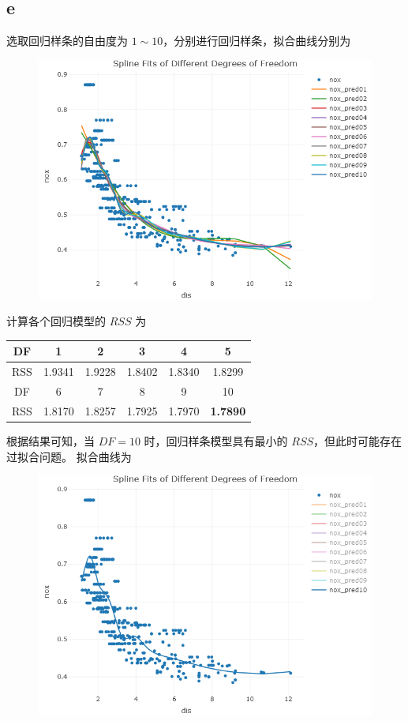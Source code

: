 \documentclass[12pt,a4paper]{article}
\begin{document}
    \subsection*{e}
    选取回归样条的自由度为 $1\sim 10$，分别进行回归样条，拟合曲线分别为
    \begin{figure}[H]
        \centering
        \includegraphics[scale=0.6]{RegSplineDF.png}
    \end{figure}
    计算各个回归模型的 $RSS$ 为
    \begin{longtable}{c|c|c|c|c|c}
        \hline
        DF & 1 & 2 & 3 & 4 & 5\\
        \hline
        RSS & 1.9341 & 1.9228 & 1.8402 & 1.8340 & 1.8299\\
        \hline
        \hline
        DF & 6 & 7 & 8 & 9 & 10\\
        \hline
        RSS & 1.8170 & 1.8257 & 1.7925 & 1.7970 & \textbf{1.7890}\\
        \hline
    \end{longtable}
    根据结果可知，当 $DF=10$ 时，回归样条模型具有最小的 $RSS$，但此时可能存在过拟合问题。
    拟合曲线为
    \begin{figure}[H]
        \centering
        \includegraphics[scale=0.6]{RegSpline10Fit.png}
    \end{figure}
\end{document}
